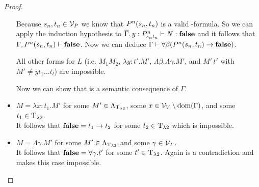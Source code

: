 \begin{proof}
\begin{itemize}
		\begin{figure}[H]
			\centering
			
		\end{figure}
		
		Because $\predTFst[n],\predTSnd[n]\in\VarP$ we know that $P^n(\predTFst[n],\predTSnd[n])$ is a valid \SysP-formula. So we can apply the induction hypothesis to $\trans{\Gamma},y:\code{P^n}{\predTFst[n]}{\predTSnd[n]}\lambdaModels N:\false$ and it follows that $\Gamma,P^n(\predTFst[n],\predTSnd[n])\PModels\false$. 
		Now we can deduce $\Gamma\PModels\forall\beta(P^n(\predTFst[n],\predTSnd[n])\to\false)$.
		
		\begin{figure}[H]
			\centering
			
		\end{figure}
		
		All other forms for $L$ (i.e. $M_1M_2$, $\lambda y:t'.M'$, $\Lambda\beta.\Lambda \gamma.M'$, and $M'\,t'$ with $M'\neq yt_1\dots t_l$) are impossible. %
		
		Now we can show that \false{} is a semantic consequence of $\Gamma$.
		
		\begin{figure}[H]
			\centering
			
		\end{figure}
		
	\item[] \underline{$M=\lambda x:t_1.M'$} for some $M'\in\Lambda_{\text{T}_{\lambda2}}$, some $x\in\mathcal{V}_V\setminus\text{dom}(\Gamma)$, and some $t_1\in\text{T}_{\lambda2}$.\\
		It follows that $\textbf{false}=t_1\to t_2$ for some $t_2\in\text{T}_{\lambda2}$ which is impossible.

	\item[] \underline{$M=\Lambda\gamma.M'$} for some $M'\in\Lambda_{\text{T}_{\lambda2}}$ and some $\gamma\in\mathcal{V}_T$.\\ %
		It follows that $\textbf{false}=\forall\gamma.t'$ for some $t'\in\text{T}_{\lambda2}$. Again is a contradiction and makes this case impossible.
		


\end{itemize}
\end{proof}
